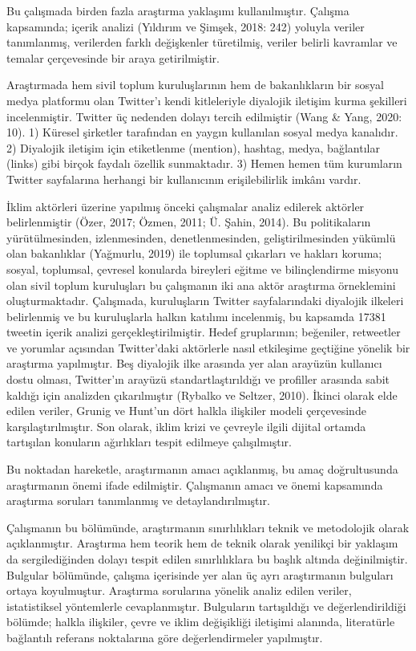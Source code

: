 \documentclass[
]{book}
\begin{document}
Bu çalışmada birden fazla araştırma yaklaşımı kullanılmıştır. Çalışma kapsamında; içerik analizi (Yıldırım ve Şimşek, 2018: 242) yoluyla veriler tanımlanmış, verilerden farklı değişkenler türetilmiş, veriler belirli kavramlar ve temalar çerçevesinde bir araya getirilmiştir.

Araştırmada hem sivil toplum kuruluşlarının hem de bakanlıkların bir sosyal medya platformu olan Twitter'ı kendi kitleleriyle diyalojik iletişim kurma şekilleri incelenmiştir. Twitter üç nedenden dolayı tercih edilmiştir (Wang \& Yang, 2020: 10). 1) Küresel şirketler tarafından en yaygın kullanılan sosyal medya kanalıdır. 2) Diyalojik iletişim için etiketlenme (mention), hashtag, medya, bağlantılar (links) gibi birçok faydalı özellik sunmaktadır. 3) Hemen hemen tüm kurumların Twitter sayfalarına herhangi bir kullanıcının erişilebilirlik imkânı vardır.

İklim aktörleri üzerine yapılmış önceki çalışmalar analiz edilerek aktörler belirlenmiştir (Özer, 2017; Özmen, 2011; Ü. Şahin, 2014). Bu politikaların yürütülmesinden, izlenmesinden, denetlenmesinden, geliştirilmesinden yükümlü olan bakanlıklar (Yağmurlu, 2019) ile toplumsal çıkarları ve hakları koruma; sosyal, toplumsal, çevresel konularda bireyleri eğitme ve bilinçlendirme misyonu olan sivil toplum kuruluşları bu çalışmanın iki ana aktör araştırma örneklemini oluşturmaktadır.
Çalışmada, kuruluşların Twitter sayfalarındaki diyalojik ilkeleri belirlenmiş ve bu kuruluşlarla halkın katılımı incelenmiş, bu kapsamda 17381 tweetin içerik analizi gerçekleştirilmiştir. Hedef gruplarının; beğeniler, retweetler ve yorumlar açısından Twitter'daki aktörlerle nasıl etkileşime geçtiğine yönelik bir araştırma yapılmıştır. Beş diyalojik ilke arasında yer alan arayüzün kullanıcı dostu olması, Twitter'ın arayüzü standartlaştırıldığı ve profiller arasında sabit kaldığı için analizden çıkarılmıştır (Rybalko ve Seltzer, 2010). İkinci olarak elde edilen veriler, Grunig ve Hunt'un dört halkla ilişkiler modeli çerçevesinde karşılaştırılmıştır. Son olarak, iklim krizi ve çevreyle ilgili dijital ortamda tartışılan konuların ağırlıkları tespit edilmeye çalışılmıştır.

Bu noktadan hareketle, araştırmanın amacı açıklanmış, bu amaç doğrultusunda araştırmanın önemi ifade edilmiştir. Çalışmanın amacı ve önemi kapsamında araştırma soruları tanımlanmış ve detaylandırılmıştır.

Çalışmanın bu bölümünde, araştırmanın sınırlılıkları teknik ve metodolojik olarak açıklanmıştır. Araştırma hem teorik hem de teknik olarak yenilikçi bir yaklaşım da sergilediğinden dolayı tespit edilen sınırlılıklara bu başlık altında değinilmiştir.
Bulgular bölümünde, çalışma içerisinde yer alan üç ayrı araştırmanın bulguları ortaya koyulmuştur. Araştırma sorularına yönelik analiz edilen veriler, istatistiksel yöntemlerle cevaplanmıştır. Bulguların tartışıldığı ve değerlendirildiği bölümde; halkla ilişkiler, çevre ve iklim değişikliği iletişimi alanında, literatürle bağlantılı referans noktalarına göre değerlendirmeler yapılmıştır.
\end{document}
